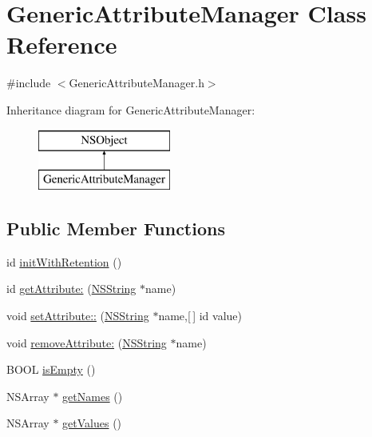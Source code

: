 \hypertarget{interface_generic_attribute_manager}{
\section{\-Generic\-Attribute\-Manager \-Class \-Reference}
\label{interface_generic_attribute_manager}
}


{\ttfamily \#include $<$\-Generic\-Attribute\-Manager.\-h$>$}

\-Inheritance diagram for \-Generic\-Attribute\-Manager\-:\begin{figure}[H]
\begin{center}
\leavevmode
\includegraphics[height=2.000000cm]{interface_generic_attribute_manager}
\end{center}
\end{figure}
\subsection*{\-Public \-Member \-Functions}
\begin{DoxyCompactItemize}
\item 
id \hyperlink{interface_generic_attribute_manager_a37180e423a015e537d137e1b789f9e32}{init\-With\-Retention} ()
\item 
id \hyperlink{interface_generic_attribute_manager_a48a4f041fb63fe321402719d8517e7e7}{get\-Attribute\-:} (\hyperlink{class_n_s_string}{\-N\-S\-String} $\ast$name)
\item 
void \hyperlink{interface_generic_attribute_manager_aa82af1f6ef460bae067988d1c510d4d3}{set\-Attribute\-::} (\hyperlink{class_n_s_string}{\-N\-S\-String} $\ast$name,\mbox{[}$\,$\mbox{]} id value)
\item 
void \hyperlink{interface_generic_attribute_manager_ab44db9312bc722bcfcb8180225b427b2}{remove\-Attribute\-:} (\hyperlink{class_n_s_string}{\-N\-S\-String} $\ast$name)
\item 
\-B\-O\-O\-L \hyperlink{interface_generic_attribute_manager_a0828431447066c344cfcfb4e911bec84}{is\-Empty} ()
\item 
\-N\-S\-Array $\ast$ \hyperlink{interface_generic_attribute_manager_a863edf93d3904d555fe7ff5e0a00645a}{get\-Names} ()
\item 
\-N\-S\-Array $\ast$ \hyperlink{interface_generic_attribute_manager_ab1f90bc5bd7fd90283faa439aaaddb08}{get\-Values} ()
\end{DoxyCompactItemize}
